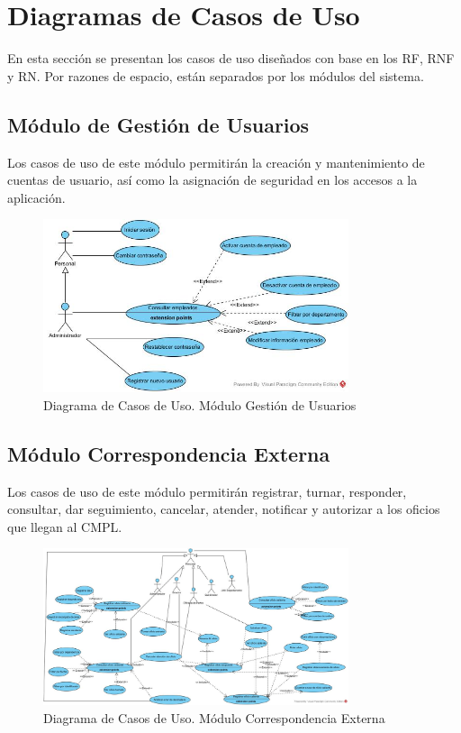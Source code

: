 \section{Diagramas de Casos de Uso}
	En esta sección se presentan los casos de uso diseñados con base en los RF, RNF y RN. Por razones de espacio, están separados por los módulos del sistema.
	
	\subsection{Módulo de Gestión de Usuarios}
	Los casos de uso de este módulo permitirán la creación y mantenimiento de cuentas de usuario, así como la asignación de seguridad en los accesos a la aplicación. 

	\begin{figure}[htbp!]
		\centering
			\includegraphics[width=0.8\textwidth]{images/Trabajo/cugestion}
		\caption{Diagrama de Casos de Uso. Módulo Gestión de Usuarios}
		\label{diagrama de cu}
	\end{figure}
	
	\subsection{Módulo Correspondencia Externa}
	Los casos de uso de este módulo permitirán registrar, turnar, responder, consultar, dar seguimiento, cancelar, atender, notificar y autorizar a los oficios que llegan al CMPL.
	
	\begin{figure}[htbp!]
		\centering
			\includegraphics[width=0.8\textwidth]{images/Trabajo/CorrespondenciaExterna}
		\caption{Diagrama de Casos de Uso. Módulo Correspondencia Externa}
		\label{diagrama de cu}
	\end{figure}
	
